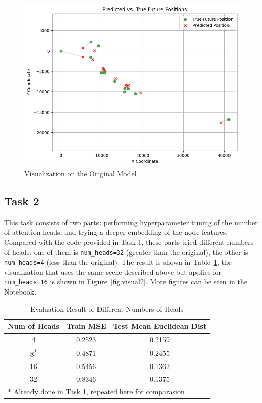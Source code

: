 \documentclass[conference]{IEEEtran}
\begin{document}
\begin{figure}[htbp]
    \centering
    \includegraphics[width=0.8\linewidth]{figvisual1.png}
    \caption{Visualization on the Original Model}
    \label{fig:visual1}
\end{figure}

\subsection*{Task 2}

This task consists of two parts: performing hyperparameter tuning of the number
of attention heads, and trying a deeper embedding of the node features.
Compared with the code provided in Task 1, these parts tried different numbers
of heads: one of them is \texttt{num\_heads=32} (greater than the original), the
other is \texttt{num\_heads=4} (less than the original). The result is shown in
Table~\ref{tab:nh}, the visualization that uses the same scene described above
but applies for \texttt{num\_heads=16} is shown in Figure~\ref{fig:visual2}.
More figures can be seen in the Notebook.

\begin{table}[htbp]
    \caption{Evaluation Result of Different Numbers of Heads}
    \begin{center}
    \begin{tabular}{|c|c|c|}
    \hline
    \textbf{Num of Heads} & \textbf{Train MSE} & \textbf{Test Mean Euclidean Dist} \\
    \hline
    4 & 0.2523 & 0.2159 \\
    \hline
    8\textsuperscript{*} & 0.4871 & 0.2455 \\
    \hline
    16 & 0.5456 & 0.1362 \\
    \hline
    32 & 0.8346 & 0.1375 \\
    \hline

    \multicolumn{3}{l}{* Already done in Task 1, repeated here
        for comparasion}
    \end{tabular}
    \label{tab:nh}
    \end{center}
\end{table}
\end{document}
